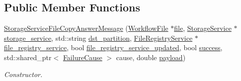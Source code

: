 \subsection*{Public Member Functions}
\begin{DoxyCompactItemize}
\item 
\hyperlink{classwrench_1_1_storage_service_file_copy_answer_message_a6849b485ea05a016cb88e08f0b29748d}{Storage\+Service\+File\+Copy\+Answer\+Message} (\hyperlink{classwrench_1_1_workflow_file}{Workflow\+File} $\ast$\hyperlink{classwrench_1_1_storage_service_file_copy_answer_message_a5d5da48c3b7a1274faf67a794477b352}{file}, \hyperlink{classwrench_1_1_storage_service}{Storage\+Service} $\ast$\hyperlink{classwrench_1_1_storage_service_file_copy_answer_message_aee16bb6721a2cca2bd17660eb69c5ede}{storage\+\_\+service}, std\+::string \hyperlink{classwrench_1_1_storage_service_file_copy_answer_message_a90e2bf5ce4303f04c0d1d92ddb98e4af}{dst\+\_\+partition}, \hyperlink{classwrench_1_1_file_registry_service}{File\+Registry\+Service} $\ast$\hyperlink{classwrench_1_1_storage_service_file_copy_answer_message_ad879a0d25951e7474ac018bf5015d53c}{file\+\_\+registry\+\_\+service}, bool \hyperlink{classwrench_1_1_storage_service_file_copy_answer_message_af024699e47c097438ec0425b1ec233a7}{file\+\_\+registry\+\_\+service\+\_\+updated}, bool \hyperlink{classwrench_1_1_storage_service_file_copy_answer_message_a30bcbbab083b6517691515877b97633b}{success}, std\+::shared\+\_\+ptr$<$ \hyperlink{classwrench_1_1_failure_cause}{Failure\+Cause} $>$ cause, double \hyperlink{classwrench_1_1_simulation_message_a914f2732713f7c02898e66f05a7cb8a1}{payload})
\begin{DoxyCompactList}\small\item\em Constructor. \end{DoxyCompactList}\end{DoxyCompactItemize}
